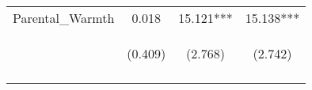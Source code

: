 \begin{tabular}{lccc}
\noalign{\smallskip}Parental_Warmth & 0.018 & 15.121*** & 15.138***\\
 & \begin{footnotesize}(0.409)\end{footnotesize} & \begin{footnotesize}(2.768)\end{footnotesize} & \begin{footnotesize}(2.742)\end{footnotesize}\\
\noalign{\smallskip}\hline\end{tabular}\\
